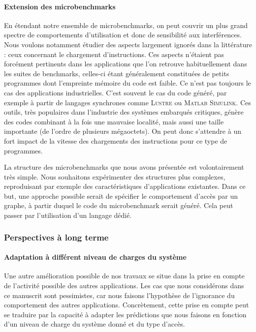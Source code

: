 \paragraph{Extension des microbenchmarks}
En étendant notre ensemble de microbenchmarks, on peut couvrir un plus grand spectre de comportements d'utilisation et donc de sensibilité aux interférences.
Nous voulons notamment étudier des aspects largement ignorés dans la littérature : ceux concernant le chargement d'instructions.
Ces aspects n'étaient pas forcément pertinents dans les applications que l'on retrouve habituellement dans les suites de benchmarks, celles-ci étant généralement constituées de petits programmes dont l'empreinte mémoire du code est faible.
Ce n'est pas toujours le cas des applications industrielles.
C'est souvent le cas du code généré, par exemple à partir de langages synchrones comme \textsc{Lustre} ou \textsc{Matlab Simulink}.
Ces outils, très populaires dans l'industrie des systèmes embarqués critiques, génère des codes combinant à la fois une mauvaise localité, mais aussi une taille importante (de l'ordre de plusieurs mégaoctets).
On peut donc s'attendre à un fort impact de la vitesse des chargements des instructions pour ce type de programmes.

La structure des microbenchmarks que nous avons présentée est volontairement très simple.
Nous souhaitons expérimenter des structures plus complexes, reproduisant par exemple des caractéristiques d'applications existantes.
Dans ce but, une approche possible serait de spécifier le comportement d'accès par un graphe, à partir duquel le code du microbenchmark serait généré.
Cela peut passer par l'utilisation d'un langage dédié.

\subsubsection{Perspectives à long terme}

\paragraph{Adaptation à différent niveau de charges du système}
Une autre amélioration possible de nos travaux se situe dans la prise en compte de l'activité possible des autres applications.
Les cas que nous considérons dans ce manuscrit sont pessimistes, car nous faisons l'hypothèse de l'ignorance du comportement des autres applications.
Concrètement, cette prise en compte peut se traduire par la capacité à adapter les prédictions que nous faisons en fonction d'un niveau de charge du système donné et du type d'accès.

